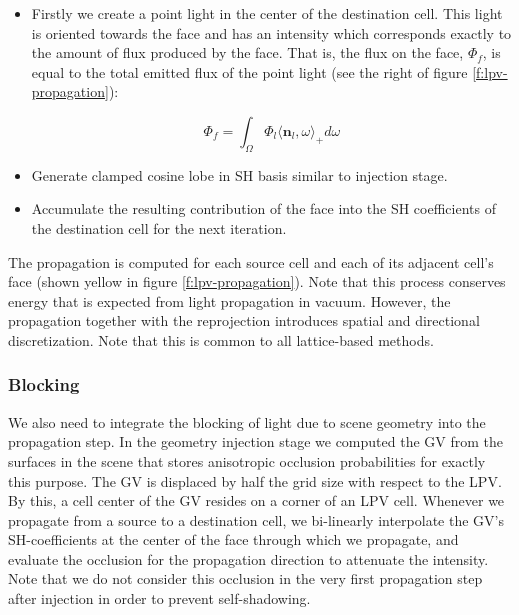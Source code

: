 \begin{itemize}
	\item Firstly we create a point light in the center of the destination cell. This light is oriented towards the face and has an intensity which corresponds exactly to the amount of flux produced by the face. That is, the flux on the face, $\Phi_f$, is equal to the total emitted flux of the point light (see the right of figure \ref{f:lpv-propagation}):

		\begin{equation*}
			\Phi_f=\int_\Omega\Phi_l\langle\mathbf{n}_l,\omega\rangle_+d\omega
		\end{equation*}
		
	\item Generate clamped cosine lobe in SH basis similar to injection stage.
	\item Accumulate the resulting contribution of the face into the SH coefficients of the destination cell for the next iteration.
\end{itemize}

The propagation is computed for each source cell and each of its adjacent cell's face (shown yellow in figure \ref{f:lpv-propagation}). Note that this process conserves energy that is expected from light propagation in vacuum. However, the propagation together with the reprojection introduces spatial and directional discretization. Note that this is common to all lattice-based methods.



\subsubsection{Blocking}
We also need to integrate the blocking of light due to scene geometry into the propagation step. In the geometry injection stage we computed the GV from the surfaces in the scene that stores anisotropic occlusion probabilities for exactly this purpose. The GV is displaced by half the grid size with respect to the LPV. By this, a cell center of the GV resides on a corner of an LPV cell. Whenever we propagate from a source to a destination cell, we bi-linearly interpolate the GV's SH-coefficients at the center of the face through which we propagate, and evaluate the occlusion for the propagation direction to attenuate the intensity. Note that we do not consider this occlusion in the very first propagation step after injection in order to prevent self-shadowing.





